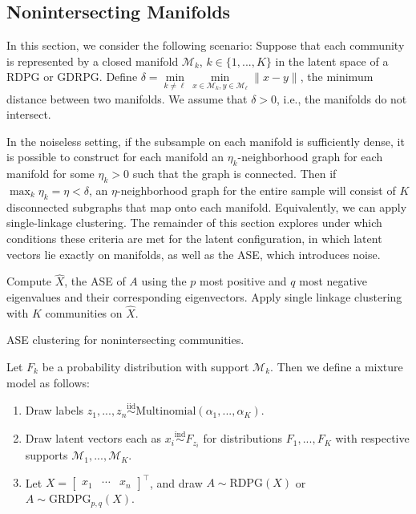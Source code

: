 \documentclass[12pt]{article}
\providecommand{\tightlist}{%
  \setlength{\itemsep}{0pt}\setlength{\parskip}{0pt}}
\begin{document}
\hypertarget{nonintersecting-manifolds}{%
\subsection{Nonintersecting Manifolds}\label{nonintersecting-manifolds}}

\label{section:nonintersecting}

In this section, we consider the following scenario: Suppose that each
community is represented by a closed manifold \(\mathcal{M}_k\),
\(k \in \{1, ..., K\}\) in the latent space of a RDPG or GDRPG. Define
\(\delta = \min\limits_{k \neq \ell} \min\limits_{x \in \mathcal{M}_k, y \in \mathcal{M}_\ell} \|x - y\|\),
the minimum distance between two manifolds. We assume that
\(\delta > 0\), i.e., the manifolds do not intersect.

In the noiseless setting, if the subsample on each manifold is
sufficiently dense, it is possible to construct for each manifold an
\(\eta_k\)-neighborhood graph for each manifold for some \(\eta_k > 0\)
such that the graph is connected. Then if
\(\max_k \eta_k = \eta < \delta\), an \(\eta\)-neighborhood graph for
the entire sample will consist of \(K\) disconnected subgraphs that map
onto each manifold. Equivalently, we can apply single-linkage
clustering. The remainder of this section explores under which
conditions these criteria are met for the latent configuration, in which
latent vectors lie exactly on manifolds, as well as the ASE, which
introduces noise.

\begin{algorithm}[h]
\DontPrintSemicolon
\SetAlgoLined
{}
Compute $\hat{X}$, the ASE of $A$ using the $p$ most positive and $q$ most negative eigenvalues and their corresponding eigenvectors.\;
Apply single linkage clustering with $K$ communities on $\hat{X}$.\;
\caption{ASE clustering for nonintersecting communities.}
\end{algorithm}

Let \(F_k\) be a probability distribution with support
\(\mathcal{M}_k\). Then we define a mixture model as follows:

\begin{enumerate}
\def\labelenumi{\arabic{enumi}.}
\tightlist
\item
  Draw labels
  \(z_1, ..., z_n \stackrel{\mathrm{iid}}{\sim}\mathrm{Multinomial}(\alpha_1, ..., \alpha_K)\).
\item
  Draw latent vectors each as
  \(x_i \stackrel{\mathrm{ind}}{\sim}F_{z_i}\) for distributions
  \(F_1, ..., F_K\) with respective supports
  \(\mathcal{M}_1, ..., \mathcal{M}_K\).
\item
  Let \(X = \begin{bmatrix} x_1 & \cdots & x_n \end{bmatrix}^\top\), and
  draw \(A \sim \mathrm{RDPG}(X)\) or
  \(A \sim \mathrm{GRDPG}_{p,q}(X)\).
\end{enumerate}
\end{document}
